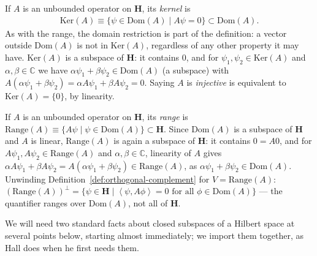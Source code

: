 \begin{definition}
    \label{def:kernel-of-an-unbounded-operator}
    \leanok
    If $A$ is an unbounded operator on $\mathbf{H}$, its \textit{kernel} is
    \begin{align}
        \text{Ker}(A) \equiv \{ \psi \in \text{Dom}(A) \mid A\psi = 0 \} \subset \text{Dom}(A).
    \end{align}
    As with the range, the domain restriction is part of the definition: a vector outside $\text{Dom}(A)$ is not in $\text{Ker}(A)$, regardless of any other property it may have. $\text{Ker}(A)$ is a subspace of $\mathbf{H}$: it contains $0$, and for $\psi_1,\psi_2 \in \text{Ker}(A)$ and $\alpha,\beta \in \mathbb{C}$ we have $\alpha\psi_1+\beta\psi_2 \in \text{Dom}(A)$ (a subspace) with $A(\alpha\psi_1+\beta\psi_2) = \alpha A\psi_1 + \beta A\psi_2 = 0$. Saying $A$ is \textit{injective} is equivalent to $\text{Ker}(A) = \{0\}$, by linearity.
\end{definition}

\begin{definition}
    \label{def:range-of-an-unbounded-operator}
    \leanok
    If $A$ is an unbounded operator on $\mathbf{H}$, its \textit{range} is $\text{Range}(A) \equiv \{ A\psi \mid \psi \in \text{Dom}(A) \} \subset \mathbf{H}$. Since $\text{Dom}(A)$ is a subspace of $\mathbf{H}$ and $A$ is linear, $\text{Range}(A)$ is again a subspace of $\mathbf{H}$: it contains $0 = A0$, and for $A\psi_1, A\psi_2 \in \text{Range}(A)$ and $\alpha,\beta \in \mathbb{C}$, linearity of $A$ gives $\alpha A\psi_1 + \beta A\psi_2 = A(\alpha\psi_1+\beta\psi_2) \in \text{Range}(A)$, as $\alpha\psi_1+\beta\psi_2 \in \text{Dom}(A)$. Unwinding Definition~\ref{def:orthogonal-complement} for $V = \text{Range}(A)$: $\left( \text{Range}(A) \right)^\perp = \{ \psi \in \mathbf{H} \mid \left< \psi, A\phi \right> = 0 \text{ for all } \phi \in \text{Dom}(A) \}$ — the quantifier ranges over $\text{Dom}(A)$, not all of $\mathbf{H}$.
\end{definition}

We will need two standard facts about closed subspaces of a Hilbert space at several points below, starting almost immediately; we import them together, as Hall does when he first needs them.

